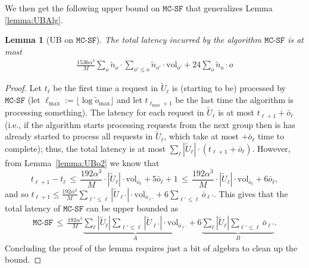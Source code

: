 \documentclass[11pt, a4paper]{article}
\theoremstyle{plain}
\newtheorem{lemma}[theorem]{Lemma}
\theoremstyle{definition}
\theoremstyle{remark}
\newcommand{\mcsdf}{\texttt{MC-SF}}
\newcommand{\vol}{\textrm{vol}}
\newcommand{\alg}{\mcsdf}
\newcommand{\po}{\tilde{o}}
\begin{document}
    We then get the following upper bound on $\alg$ that generalizes Lemma \ref{lemma:UBAlg}.

\begin{lemma}[UB on $\alg$] \label{lemma:UBAlg2}
	The total latency incurred by the algorithm $\alg$ is at most
	\begin{align*}
		\frac{1536\alpha^3}{M} \sum_{o} \tilde{n}_{o} \cdot \sum_{o' \le o} \tilde{n}_{o'} \cdot  \vol_{o'} + 24 \sum_{o} \tilde{n}_{o} \cdot o
	\end{align*}
\end{lemma}

\begin{proof}
	Let $t_\ell$ be the first time a request in $\tilde{U}_\ell$ is (starting to be) processed by $\alg$ (let $\ell_{\max} := \lfloor \log \po_{\max} \rfloor$ and let $t_{\ell_{\max} + 1}$ be the last time the algorithm is processing something). The latency for each request in $\tilde{U}_\ell$ is at most {$t_{\ell+1} + \bar{o}_\ell$} (i.e., if the algorithm starts processing requests from the next group then is has already started to process all requests in $\tilde{U}_\ell$, which take at most $+ \bar{o}_\ell$ time to complete); thus, the total latency is at most $\sum_\ell |\tilde{U}_\ell| \cdot ({t_{\ell+1} + \bar{o}_\ell})$. However, from Lemma~\ref{lemma:UBo2} we know that $$t_{\ell+1} - t_{\ell} \,\le\, \frac{192\alpha^3}{M} \cdot |\tilde{U}_\ell| \cdot \vol_{\bar{o}_\ell} + 5\bar{o}_\ell + 1 \,\le\, \frac{192\alpha^3}{M} \cdot |\tilde{U}_\ell| \cdot \vol_{\bar{o}_\ell} + 6\bar{o}_\ell,$$ and so $t_{\ell + 1} \le \frac{192\alpha^3}{M} \sum_{\ell' \le \ell} |\tilde{U}_{\ell'}| \cdot \vol_{\bar{o}_{\ell'}} + 6 \sum_{\ell' \le \ell} \bar{o}_{\ell'}$.    This gives that the total latency of $\alg$ can be upper bounded as 
	\begin{align}
		\alg \,\le\, \frac{192\alpha^3}{M} \underbrace{\sum_\ell |\tilde{U}_\ell| \sum_{\ell' \le \ell} |\tilde{U}_{\ell'}| \cdot \vol_{\bar{o}_{\ell'}}}_{A} + 6 \underbrace{\sum_\ell |\tilde{U}_\ell| \sum_{\ell' \le \ell} \bar{o}_{\ell'}}_{B}.  \label{eq:UBAlg2}
	\end{align}
	Concluding the proof of the lemma requires just a bit of algebra to clean up the bound. 
	

\end{proof}
\end{document}
